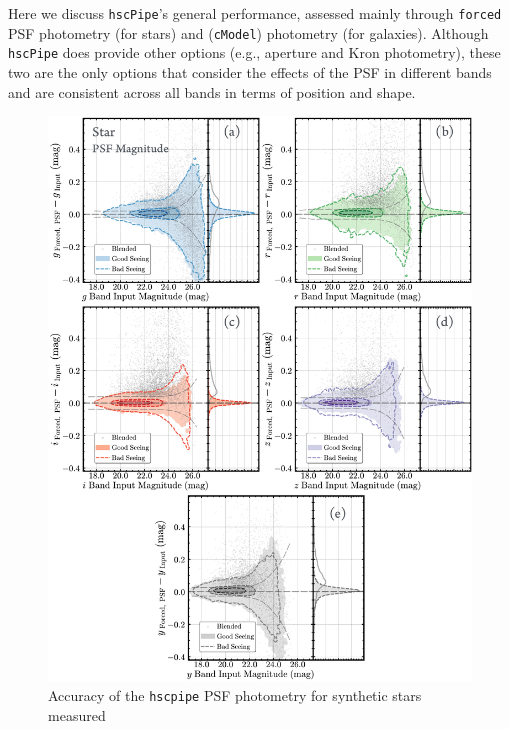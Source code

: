 \documentclass[useamsfonts]{pasj01}
\def\hscpipe{\texttt{hscPipe}}
\def\cmodel{\texttt{cModel}}
\def\forced{\texttt{forced}}
\begin{document}
    Here we discuss \hscpipe{}'s general performance, assessed mainly through \forced{} 
    PSF photometry (for stars) and (\cmodel{}) photometry (for galaxies).
    Although \hscpipe{} does provide other options (e.g., aperture and Kron photometry),
    these two are the only options that consider the effects of the PSF in different 
    bands and are consistent across all bands in terms of position and shape. 
    

\begin{figure}
    \begin{center}
        \includegraphics[width=16cm]{fig/synpipe_psf_mag}
    \end{center}
    \caption{
        Accuracy of the \texttt{hscpipe} PSF photometry for synthetic stars measured
}
\end{figure}
\end{document}
